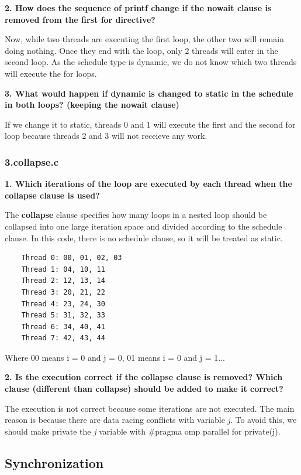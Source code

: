 \documentclass[12pt, a4paper]{article}
\begin{document}
\hfill

\textbf{2. How does the sequence of printf change if the nowait clause is removed from the first for
directive?}

Now, while two threads are executing the first loop, the other two will remain doing nothing. Once they end with the loop, only 2 threads will enter in the second loop. As the schedule type is dynamic, we do not know which two threads will execute the for loops.

\hfill

\textbf{3. What would happen if dynamic is changed to static in the schedule in both loops? (keeping
the nowait clause)}

If we change it to static, threads 0 and 1 will execute the first and the second for loop because threads 2 and 3 will not receieve any work.

\subsubsection{3.collapse.c}

\textbf{1. Which iterations of the loop are executed by each thread when the collapse clause is used?}

The \textbf{collapse} clause specifies how many loops in a nested loop should be collapsed into one large iteration space and divided according to the schedule clause. In this code, there is no schedule clause, so it will be treated as static.

\begin{lstlisting}
	Thread 0: 00, 01, 02, 03
	Thread 1: 04, 10, 11
	Thread 2: 12, 13, 14
	Thread 3: 20, 21, 22
	Thread 4: 23, 24, 30
	Thread 5: 31, 32, 33
	Thread 6: 34, 40, 41
	Thread 7: 42, 43, 44
\end{lstlisting}

Where 00 means i = 0 and j = 0, 01 means i = 0 and j = 1...

\hfill

\textbf{2. Is the execution correct if the collapse clause is removed? Which clause (different than collapse) should be added to make it correct?}

The execution is not correct because some iterations are not executed. The main reason is because there are data racing conflicts with variable \textit{j}. To avoid this, we should make private the \textit{j} variable with \#pragma omp parallel for private(j).

\subsection{Synchronization}
\end{document}
